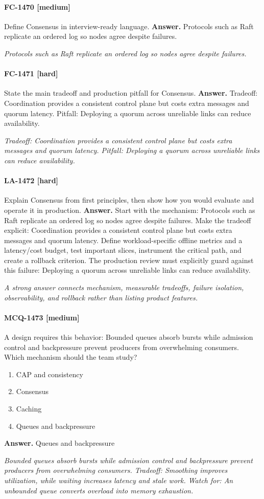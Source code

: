 \paragraph{FC-1470 [medium]} Define Consensus in interview-ready language.
\noindent\textbf{Answer.} Protocols such as Raft replicate an ordered log so nodes agree despite failures.
\par\textit{Protocols such as Raft replicate an ordered log so nodes agree despite failures.}
\paragraph{FC-1471 [hard]} State the main tradeoff and production pitfall for Consensus.
\noindent\textbf{Answer.} Tradeoff: Coordination provides a consistent control plane but costs extra messages and quorum latency. Pitfall: Deploying a quorum across unreliable links can reduce availability.
\par\textit{Tradeoff: Coordination provides a consistent control plane but costs extra messages and quorum latency. Pitfall: Deploying a quorum across unreliable links can reduce availability.}
\paragraph{LA-1472 [hard]} Explain Consensus from first principles, then show how you would evaluate and operate it in production.
\noindent\textbf{Answer.} Start with the mechanism: Protocols such as Raft replicate an ordered log so nodes agree despite failures. Make the tradeoff explicit: Coordination provides a consistent control plane but costs extra messages and quorum latency. Define workload-specific offline metrics and a latency/cost budget, test important slices, instrument the critical path, and create a rollback criterion. The production review must explicitly guard against this failure: Deploying a quorum across unreliable links can reduce availability.
\par\textit{A strong answer connects mechanism, measurable tradeoffs, failure isolation, observability, and rollback rather than listing product features.}
\paragraph{MCQ-1473 [medium]} A design requires this behavior: Bounded queues absorb bursts while admission control and backpressure prevent producers from overwhelming consumers. Which mechanism should the team study?
\begin{enumerate}[label=\Alph*.]
\item CAP and consistency
\item Consensus
\item Caching
\item Queues and backpressure
\end{enumerate}
\noindent\textbf{Answer.} Queues and backpressure
\par\textit{Bounded queues absorb bursts while admission control and backpressure prevent producers from overwhelming consumers. Tradeoff: Smoothing improves utilization, while waiting increases latency and stale work. Watch for: An unbounded queue converts overload into memory exhaustion.}
